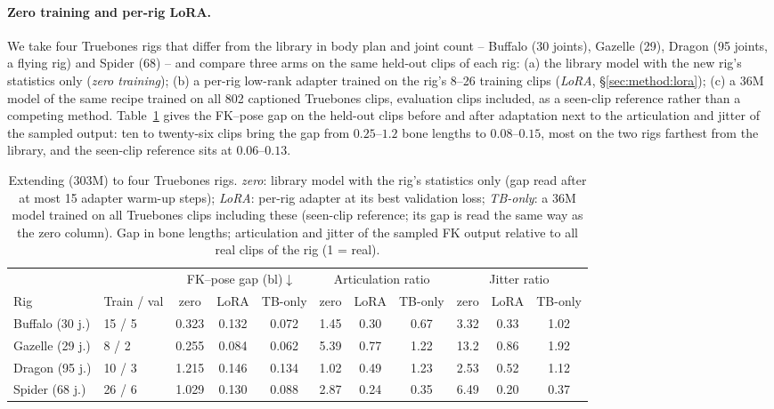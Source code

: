 \paragraph{Zero training and per-rig LoRA.} We take four Truebones rigs that differ from the
library in body plan and joint count -- Buffalo (30 joints), Gazelle (29), Dragon (95 joints, a
flying rig) and Spider (68) -- and compare three arms on the same held-out clips of each rig:
(a) the library model with the new rig's statistics only (\emph{zero training}); (b) a per-rig
low-rank adapter trained on the rig's 8--26 training clips (\emph{LoRA}, \S\ref{sec:method:lora});
(c) a \num{36}M model of the same recipe trained on all \num{802} captioned Truebones clips,
evaluation clips included, as a seen-clip reference rather than a competing method.
Table~\ref{tab:lora} gives the FK--pose gap on the held-out clips before and after adaptation next
to the articulation and jitter of the sampled output: ten to twenty-six clips bring the gap from
$0.25$--$1.2$ bone lengths to $0.08$--$0.15$, most on the two rigs farthest from the library, and
the seen-clip reference sits at $0.06$--$0.13$.

\begin{table}[t]
\centering\footnotesize\setlength{\tabcolsep}{3.5pt}
\caption{Extending \method{} (\num{303}M) to four Truebones rigs. \emph{zero}: library model with
the rig's statistics only (gap read after at most 15 adapter warm-up steps); \emph{LoRA}: per-rig
adapter at its best validation loss; \emph{TB-only}: a \num{36}M model trained on all Truebones
clips including these (seen-clip reference; its gap is read the same way as the zero column). Gap in bone lengths; articulation and jitter of the
sampled FK output relative to all real clips of the rig (1 = real).}\label{tab:lora}
\begin{tabular}{@{}llccccccccc@{}}
\toprule
& & \multicolumn{3}{c}{FK--pose gap (bl)$\downarrow$} & \multicolumn{3}{c}{Articulation ratio} & \multicolumn{3}{c}{Jitter ratio} \\
\cmidrule(lr){3-5}\cmidrule(lr){6-8}\cmidrule(lr){9-11}
Rig & Train / val & zero & LoRA & TB-only & zero & LoRA & TB-only & zero & LoRA & TB-only \\
\midrule
Buffalo (30 j.) & 15 / 5 & \num{0.323} & \num{0.132} & \num{0.072} & \num{1.45} & \num{0.30} & \num{0.67} & \num{3.32} & \num{0.33} & \num{1.02} \\
Gazelle (29 j.) & 8 / 2  & \num{0.255} & \num{0.084} & \num{0.062} & \num{5.39} & \num{0.77} & \num{1.22} & \num{13.2} & \num{0.86} & \num{1.92} \\
Dragon (95 j.)  & 10 / 3 & \num{1.215} & \num{0.146} & \num{0.134} & \num{1.02} & \num{0.49} & \num{1.23} & \num{2.53} & \num{0.52} & \num{1.12} \\
Spider (68 j.)  & 26 / 6 & \num{1.029} & \num{0.130} & \num{0.088} & \num{2.87} & \num{0.24} & \num{0.35} & \num{6.49} & \num{0.20} & \num{0.37} \\
\bottomrule
\end{tabular}
\end{table}

